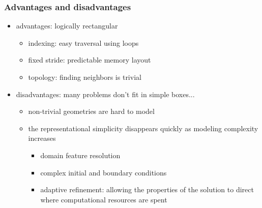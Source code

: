 \begin{frame}[fragile]
%
  \frametitle{Advantages and disadvantages}
%
  \begin{itemize}
%
  \item advantages: logically rectangular
    \begin{itemize}
    \item indexing: easy traversal using loops
    \item fixed stride: predictable memory layout
    \item topology: finding neighbors is trivial
    \end{itemize}
%
    \item disadvantages: many problems don't fit in simple boxes...
      \begin{itemize}
      \item non-trivial geometries are hard to model
      \item the representational simplicity disappears quickly as modeling complexity increases
        \begin{itemize}
        \item domain feature resolution
        \item complex initial and boundary conditions 
        \item adaptive refinement: allowing the properties of the solution to direct where
          computational resources are spent
        \end{itemize}
      \end{itemize}
% 
  \end{itemize}
%
\end{frame}

